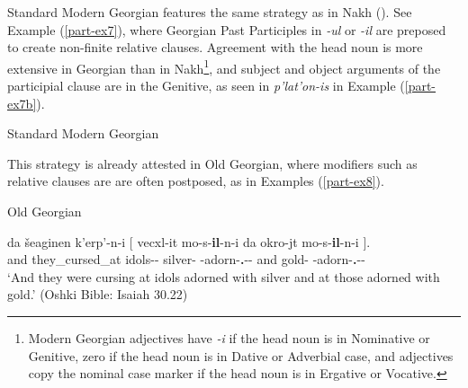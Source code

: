 Standard Modern Georgian features the same strategy as in Nakh (\cite[185--212]{hewitt87}). See Example (\ref{part-ex7}), where Georgian Past Participles in \textit{-ul} or \textit{-il} are preposed to create non-finite relative clauses. Agreement with the head noun is more extensive in Georgian than in Nakh\footnote{Modern Georgian adjectives have \textit{-i} if the head noun is in Nominative or Genitive, zero if the head noun is in Dative or Adverbial case, and adjectives copy the nominal case marker if the head noun is in Ergative or Vocative.}, and subject and object arguments of the participial clause are in the Genitive, as seen in \textit{p'lat'on-is} in Example (\ref{part-ex7b}).


\begin{exe}
	\ex\label{part-ex7} 
    Standard Modern Georgian
\end{exe}

This strategy is already attested in Old Georgian, where modifiers such as relative clauses are are often postposed, as in Examples (\ref{part-ex8}).


	\begin{exe}
		\ex\label{part-ex8}
		Old Georgian
        
		\gll da	šeaginen	k'erp'-n-i	{{\normalfont[} vecxl-it}	mo-s-\textbf{il}-n-i	da 	okro-jt	{mo-s-\textbf{il}-n-i {\normalfont]}}. \\
		and	they\_cursed\_at	idols-{\Pl}-{\Nom}	silver-{\Ins}	{\Pv}-adorn-\textbf{{\Ptcp}.{\Pst}}-{\Pl}-{\Nom}	and gold-{\Ins}	{\Pv}-adorn-\textbf{{\Ptcp}.{\Pst}}-{\Pl}-{\Nom} \\
		\trans `And they were cursing at idols adorned with silver and at those adorned with gold.’ 
		\hfill (Oshki Bible: Isaiah 30.22)
	\end{exe}





